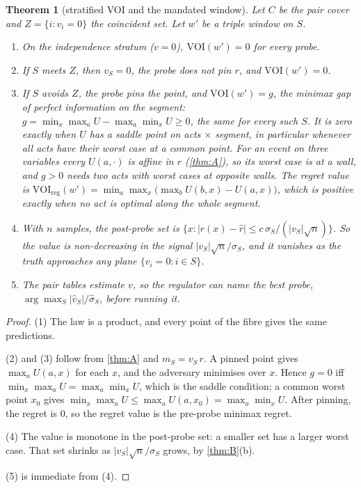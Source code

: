 \documentclass[11pt]{article}
\newtheorem{theorem}{Theorem}\renewcommand{\thetheorem}{\Alph{theorem}}
\theoremstyle{definition}\newtheorem{definition}{Definition}\newtheorem{remark}{Remark}
\begin{document}
\begin{theorem}[stratified VOI and the mandated window]\label{thm:C}
Let $C$ be the pair cover and $Z=\{i:v_i=0\}$ the coincident set. Let $w'$ be a triple window on $S$.
\begin{enumerate}
\item[(1)] On the independence stratum ($v=0$), $\mathrm{VOI}(w')=0$ for every probe.
\item[(2)] If $S$ meets $Z$, then $v_S=0$, the probe does not pin $r$, and $\mathrm{VOI}(w')=0$.
\item[(3)] If $S$ avoids $Z$, the probe pins the point, and $\mathrm{VOI}(w')=g$, the minimax gap of perfect information on the segment:
$g=\min_x\max_aU-\max_a\min_xU\ge0$, the same for every such $S$. It is zero exactly when $U$ has a saddle point on acts $\times$
segment, in particular whenever all acts have their worst case at a common point. For an event on three variables every $U(a,\cdot)$
is affine in $r$ (\cref{thm:A}), so its worst case is at a wall, and $g>0$ needs two acts with worst cases at opposite walls. The regret
value is $\mathrm{VOI}_{\mathrm{reg}}(w')=\min_a\max_x\bigl(\max_bU(b,x)-U(a,x)\bigr)$, which is positive exactly when no act is
optimal along the whole segment.
\item[(4)] With $n$ samples, the post-probe set is $\{x:|r(x)-\hat r|\le c\,\sigma_S/(|v_S|\sqrt n)\}$. So the value is non-decreasing in
the signal $|v_S|\sqrt n/\sigma_S$, and it vanishes as the truth approaches any plane $\{v_i=0:i\in S\}$.
\item[(5)] The pair tables estimate $v$, so the regulator can name the best probe, $\arg\max_S|\hat v_S|/\hat\sigma_S$, before
running it.
\end{enumerate}
\end{theorem}

\begin{proof}
(1) The law is a product, and every point of the fibre gives the same predictions.

(2) and (3) follow from \cref{thm:A} and $m_S=v_S\,r$. A pinned point gives $\max_aU(a,x)$ for each $x$, and the adversary minimises
over $x$. Hence $g=0$ iff $\min_x\max_aU=\max_a\min_xU$, which is the saddle condition; a common worst point $x_0$ gives
$\min_x\max_aU\le\max_aU(a,x_0)=\max_a\min_xU$. After pinning, the regret is $0$, so the regret value is the pre-probe minimax
regret.

(4) The value is monotone in the post-probe set: a smaller set has a larger worst case. That set shrinks as $|v_S|\sqrt n/\sigma_S$
grows, by \cref{thm:B}(b).

(5) is immediate from (4).
\end{proof}
\end{document}
